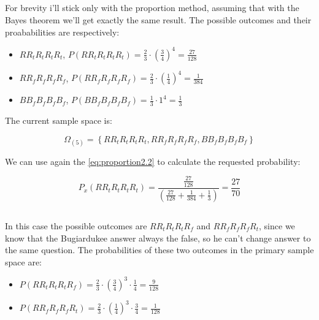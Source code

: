 \documentclass{article}
\begin{document}
\subsection{}
For brevity i'll stick only with the proportion method, assuming that with the Bayes theorem we'll get exactly the same result. The possible outcomes and their proababilities are respectively:

\begin{itemize}
	\item $RR_{t}R_{t}R_{t}R_{t}$, \space\space\space $P(RR_{t}R_{t}R_{t}R_{t}) = \frac {2} {3} \cdot  \left( \frac{3} {4} \right)^{4} = \frac {27} {128}$
	\item $RR_{f}R_{f}R_{f}R_{f}$, \space\space\space$P(RR_{f}R_{f}R_{f}R_{f}) = \frac {2} {3} \cdot  \left( \frac{1} {4} \right)^{4} = \frac {1} {384}$
	\item  $BB_{f}B_{f}B_{f}B_{f}$, \space\space\space$P(BB_{f}B_{f}B_{f}B_{f}) = \frac {1} {3} \cdot 1^{4} = \frac {1} {3}$
\end{itemize}

The current sample space is:

\begin{equation} \label{eq:sampleSpace2.4}
\Omega_{(5)} =  \left\{ RR_{t}R_{t}R_{t}R_{t}, RR_{f}R_{f}R_{f}R_{f}, BB_{f}B_{f}B_{f}B_{f}  \right\}
\end{equation}

We can use again the \eqref{eq:proportion2.2} to calculate the requested probability:

\begin{equation} \label{eq:proportion2.24}
P_{x}(RR_{t}R_{t}R_{t}R_{t}) = \frac  { \frac {27} {128} }  { ( \frac {27} {128} + \frac {1} {384} + \frac {1} {3} ) } = \frac {27} {70}
\end{equation}



\subsection{}
In this case the possible outcomes are $RR_{t}R_{t}R_{t}R_{f}$ and $RR_{f}R_{f}R_{f}R_{t}$, since we know that the Bugiardukee answer always the false, 
so he can't change answer to the same question. The probabilities of these two outcomes in the primary sample space are:


\begin{itemize}
	\item $P(RR_{t}R_{t}R_{t}R_{f}) = \frac {2} {3} \cdot  \left( \frac{3} {4} \right)^{3} \cdot \frac {1} {4} = \frac {9} {128}$
	\item $P(RR_{f}R_{f}R_{f}R_{t}) = \frac {2} {3} \cdot  \left( \frac{1} {4} \right)^{3} \cdot \frac {3} {4} = \frac {1} {128}$	
\end{itemize}
\end{document}
